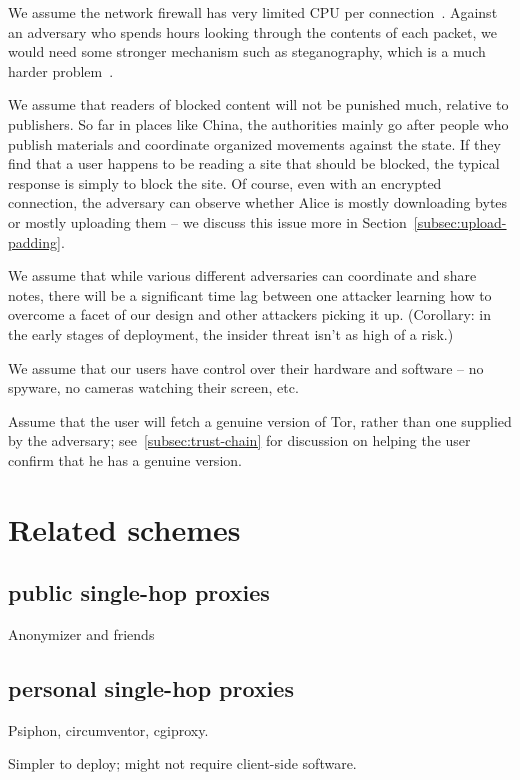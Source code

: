 \documentclass{llncs}
\begin{document}
We assume the network firewall has very limited CPU per
connection~\cite{clayton:pet2006}. Against an adversary who spends
hours looking through the contents of each packet, we would need
some stronger mechanism such as steganography, which is a much harder
problem~\cite{foo,bar,baz}.

We assume that readers of blocked content will not be punished much,
relative to publishers. So far in places like China, the authorities
mainly go after people who publish materials and coordinate organized
movements against the state. If they find that a user happens to be
reading a site that should be blocked, the typical response is simply
to block the site. Of course, even with an encrypted connection,
the adversary can observe whether Alice is mostly downloading
bytes or mostly uploading them -- we discuss this issue more in
Section~\ref{subsec:upload-padding}.

We assume that while various different adversaries can coordinate and share
notes, there will be a significant time lag between one attacker learning
how to overcome a facet of our design and other attackers picking it up.
(Corollary: in the early stages of deployment, the insider threat isn't
as high of a risk.)

We assume that our users have control over their hardware and software --
no spyware, no cameras watching their screen, etc.

Assume that the user will fetch a genuine version of Tor, rather than
one supplied by the adversary; see~\ref{subsec:trust-chain} for discussion
on helping the user confirm that he has a genuine version.

\section{Related schemes}

\subsection{public single-hop proxies}

Anonymizer and friends

\subsection{personal single-hop proxies}

Psiphon, circumventor, cgiproxy.

Simpler to deploy; might not require client-side software.
\end{document}
